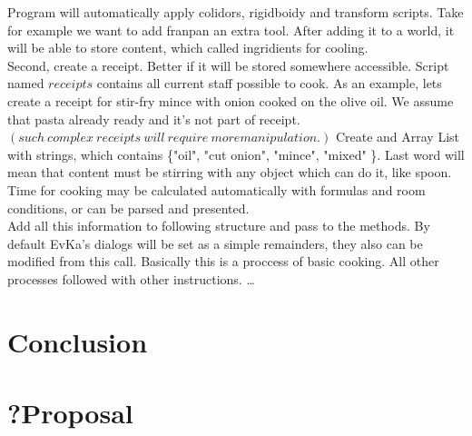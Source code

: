 \documentclass[18pt]{article}
\numberwithin{equation}{section} %
\numberwithin{figure}{section} %
\numberwithin{table}{section} %
\begin{document}
	Program will automatically apply colidors, rigidboidy and transform scripts. Take for example we want to add franpan an extra tool. After adding it to a world, it will be able to store content, which called ingridients for cooling. \\
	
	Second, create a receipt. Better if it will be stored somewhere accessible. Script named $receipts$ contains all current staff possible to cook. As an example, lets create a receipt for stir-fry mince with onion cooked on the olive oil. We assume that pasta already ready and it's not part of receipt. $ \left(such\ complex\ receipts\ will\ require\ more manipulation.  \right) $ Create and Array List with strings, which contains \{"oil", "cut onion", "mince", "mixed" \}. Last word will mean that content must be stirring with any object which can do it, like spoon. Time for cooking may be calculated automatically with formulas and room conditions, or can be parsed and presented. \\
	
	Add all this information to following structure and pass to the methods. By default EvKa's dialogs will be set as a simple remainders, they also can be modified from this call. Basically this is a proccess of basic cooking. All other processes followed with other instructions. \ldots
	
	
	
	
\section{Conclusion}	
\section{?Proposal}	
	
	

\newpage
\begin{flushleft}



\end{flushleft}
\end{document}
